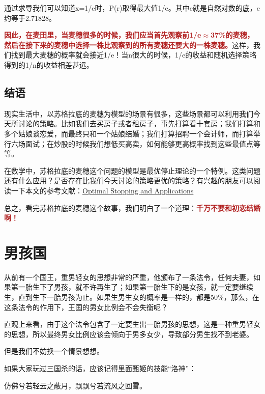 \documentclass[12pt, letterpaper]{ctexrep}
\newenvironment{shadedquotation}
 {\begin{shaded*}
  \quoting[leftmargin=5pt, rightmargin=5pt, vskip=0pt]
 }
 {\endquoting
 \end{shaded*}
}
\begin{document}
通过求导我们可以知道x=1/e时，P(r)取得最大值1/e。其中e就是自然对数的底，e约等于2.71828。

\textbf{\textcolor{Firebrick}{因此，在麦田里，当麦穗很多的时候，我们应当首先观察前1/e$\approx$37\%的麦穗，然后在接下来的麦穗中选择一株比观察到的所有麦穗还要大的一株麦穗。}}这样，我们找到最大麦穗的概率就会接近1/e！当n很大的时候，1/e的收益和随机选择策略得到的1/n的收益相差甚远。

\subsection{结语}

现实生活中，以苏格拉底的麦穗为模型的场景有很多，这些场景都可以利用我们今天所讨论的策略。比如我们去买房子或者租房子，事先打算看十套房；我们打算和多个姑娘谈恋爱，而最终只和一个姑娘结婚；我们打算招聘一个会计师，而打算举行六场面试；在炒股的时候我们想低买高卖，如何能够更高概率找到这些最值点等等。

在数学中，苏格拉底的麦穗这个问题的模型是最优停止理论的一个特例。这类问题还有什么应用？是否存在比我们今天讨论的策略更优的策略？有兴趣的朋友可以阅读一下本文的参考文献：\href{http://www.math.ucla.edu/~tom/Stopping/Contents.html}{Optimal Stopping and Applications}

总之，看完苏格拉底的麦穗这个故事，我们明白了一个道理：\textbf{\textcolor{Firebrick}{千万不要和初恋结婚啊！}}


\section{男孩国}
\begin{shadedquotation}
\noindent
从前有一个国王，重男轻女的思想非常的严重，他颁布了一条法令，任何夫妻，如果第一胎生下了男孩，就不许再生了；如果第一胎生下的是女孩，就一定要继续生，直到生下一胎男孩为止。如果生男生女的概率是一样的，都是50\%，那么，在这条法令的作用下，王国的男女比例会不会失衡呢？
\end{shadedquotation}


直观上来看，由于这个法令包含了一定要生出一胎男孩的思想，这是一种重男轻女的思想，所以最终男女比例应该会倾向于男多女少，导致部分男生找不到老婆。

但是我们不妨换一个情景想想。

如果大家玩过三国杀的话，应该记得里面甄姬的技能“洛神”：

\begin{shadedquotation}
\noindent
仿佛兮若轻云之蔽月，飘飘兮若流风之回雪。
\end{shadedquotation}
\end{document}
